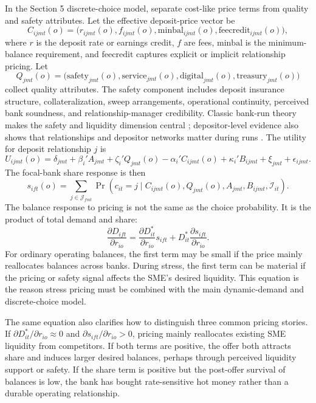 \documentclass[11pt]{article}
\begin{document}
In the Section 5 discrete-choice model, separate cost-like price terms from
quality and safety attributes. Let the effective deposit-price vector be
\[
  C_{ijmt}(o)
  =
  \big(r_{ijmt}(o), f_{ijmt}(o), \mathrm{minbal}_{ijmt}(o),
  \mathrm{feecredit}_{ijmt}(o)\big),
\]
where $r$ is the deposit rate or earnings credit, $f$ are fees, $\mathrm{minbal}$
is the minimum-balance requirement, and $\mathrm{feecredit}$ captures explicit
or implicit relationship pricing. Let
\[
  Q_{jmt}(o)
  =
  \big(\mathrm{safety}_{jmt}(o),\mathrm{service}_{jmt}(o),
  \mathrm{digital}_{jmt}(o),\mathrm{treasury}_{jmt}(o)\big)
\]
collect quality attributes. The safety component includes deposit insurance
structure, collateralization, sweep arrangements, operational continuity,
perceived bank soundness, and relationship-manager credibility.
Classic bank-run theory makes the safety and liquidity dimension central
\citep{diamond1983bankruns}; depositor-level evidence also shows that
relationships and depositor networks matter during runs \citep{iyer2012bankruns}.
The utility for deposit relationship $j$ is
\[
  U_{ijmt}(o)
  =
  \delta_{jmt}
  +\beta_i'A_{jmt}
  +\zeta_i'Q_{jmt}(o)
  -\alpha_i'C_{ijmt}(o)
  +\kappa_i'B_{ijmt}
  +\xi_{jmt}
  +\epsilon_{ijmt}.
\]
The focal-bank share response is then
\[
  s_{ift}(o)
  =
  \sum_{j\in\mathcal{J}_{fmt}}
  \Pr(c_{it}=j\mid C_{ijmt}(o),Q_{jmt}(o),A_{jmt},B_{ijmt},\mathcal{I}_{it}).
\]
The balance response to pricing is not the same as the choice probability. It
is the product of total demand and share:
\[
  \frac{\partial D_{ift}}{\partial r_{io}}
  =
  \frac{\partial D_{it}^{*}}{\partial r_{io}}s_{ift}
  +
  D_{it}^{*}\frac{\partial s_{ift}}{\partial r_{io}}.
\]
For ordinary operating balances, the first term may be small if the price
mainly reallocates balances across banks. During stress, the first term can be
material if the pricing or safety signal affects the SME's desired liquidity.
This equation is the reason stress pricing must be combined with the main
dynamic-demand and discrete-choice model.

The same equation also clarifies how to distinguish three common pricing
stories. If $\partial D_{it}^{*}/\partial r_{io}\approx 0$ and
$\partial s_{ift}/\partial r_{io}>0$, pricing mainly reallocates existing SME
liquidity from competitors. If both terms are positive, the offer both attracts
share and induces larger desired balances, perhaps through perceived liquidity
support or safety. If the share term is positive but the post-offer survival of
balances is low, the bank has bought rate-sensitive hot money rather than a
durable operating relationship.
\end{document}
